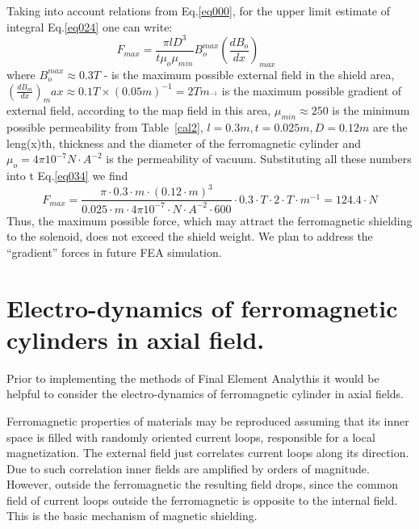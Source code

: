 \documentclass[12pt]{article}
\begin{document}
Taking into account  relations from Eq.\ref{eq000},
for  the  upper limit  estimate of
integral Eq.\ref{eq024}    one  can write:
%
\begin{equation}
{F_{max}= \frac{\pi l D^3}{t\mu_{o}\mu_{min}}
B_{o}^{max} ( \frac {dB_o} {dx})_{max}}~~~~~~~~~~~
\label{eq034}
\end{equation}
where $B_o^{max}\approx0.3T$  - is the maximum  possible
external field  in the shield area,
$(\frac{dB_m}{dx})_max\approx0.1T\times
(0.05m)^{-1}=2Tm_^{-1}$
 is the maximum possible gradient of
external field, according to the map field in this area,
$\mu_{min}\approx250$  is the minimum possible permeability
from Table~\ref{cal2},
 $l=0.3m, t=0.025m, D=0.12m$ are the  leng(x)th,  thickness
and the diameter of the ferromagnetic cylinder and
$\mu_o = 4\pi 10^{-7}N·A^{-2}$ is the permeability of vacuum.
Substituting all these numbers into  t Eq.\ref{eq034} we find
%
\begin{equation}
F_{max}= \frac{\pi \cdot 0.3 \cdot m
\cdot (0.12 \cdot m)^3 }{0.025\cdot m \cdot
4 \pi 10^{-7}\cdot N \cdot A^{-2} \cdot 600} \cdot
0.3 \cdot T \cdot 2 \cdot T\cdot m^{-1}= 124.4 \cdot N
\label{eq035}
\end{equation}
%
Thus,  the maximum possible  force, which
may attract the  ferromagnetic shielding to the solenoid,
does not exceed the   shield  weight.  
We plan  to  address the  ``gradient'' forces in future   FEA simulation.









\section{Electro-dynamics of  ferromagnetic cylinders  in axial field.}

\label{ednmics}

Prior to implementing the  methods of  Final Element Analythis  it would  
be  helpful to consider   the electro-dynamics of ferromagnetic  cylinder in axial fields.

Ferromagnetic properties of materials may be
reproduced assuming that  its  inner space
 is filled with  randomly oriented  current loops,
 responsible for a local  magnetization.
 The external  field  just correlates   
 current loops along its direction.
Due to such correlation inner   fields   
are amplified  by  orders of magnitude.
However,  outside the ferromagnetic the resulting field  
drops, since  the  common   field of   current loops
 outside the ferromagnetic is opposite to the internal field. 
 This  is the basic   mechanism of  magnetic  shielding.
\end{document}
